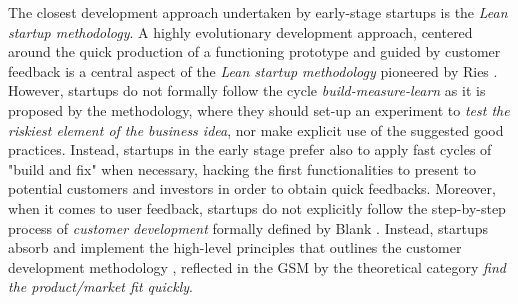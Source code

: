 \documentclass[10pt,journal,letterpaper,compsoc]{IEEEtran}
\begin{document}
The closest development approach undertaken by early-stage startups is  the
\textit{Lean startup methodology}.  A highly evolutionary development  approach,
centered around the quick production of a functioning prototype and  guided by
customer feedback is a central aspect of the \textit{Lean startup  methodology}
pioneered by Ries \cite{Ries2011}. However, startups do not  formally follow the
cycle \textit{build-measure-learn} as it is proposed by the  methodology, where
they should set-up an experiment to \textit{test the riskiest  element of the
business idea}, nor make explicit use of the suggested good  practices. Instead,
startups in the early stage prefer also to apply fast cycles of "build and fix"
when necessary, hacking the first functionalities to present to potential
customers and investors in order to obtain quick feedbacks. 
Moreover, when it comes to user feedback, startups do  not explicitly follow 
the step-by-step process of \textit{customer development} formally defined by 
Blank \cite{Blank2005}. Instead, startups absorb and  implement the high-level
principles that outlines the customer development methodology
, reflected in the GSM by the theoretical category \textit{find the  
product/market fit quickly}.


\end{document}
